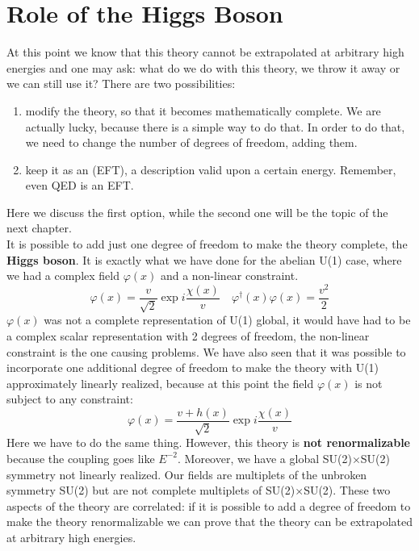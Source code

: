 \documentclass[../main.tex]{subfiles}
\begin{document}
\section{Role of the Higgs Boson}
At this point we know that this theory cannot be extrapolated at arbitrary high energies and one may ask: what do we do with this theory, we throw it away or we can still use it? There are two possibilities:
\begin{enumerate}
    \item modify the theory, so that it becomes mathematically complete. We are actually lucky, because there is a simple way to do that. In order to do that, we need to change the number of degrees of freedom, adding them.
    \item keep it as an  (EFT), a description valid upon a certain energy. Remember, even QED is an EFT.
\end{enumerate}
Here we discuss the first option, while the second one will be the topic of the next chapter.\\
It is possible to add just one degree of freedom to make the theory complete, the \textbf{Higgs boson}. It is exactly what we have done for the abelian U(1) case, where we had a complex field $\varphi(x)$ and a non-linear constraint.
\[
\varphi(x)=\frac{v}{\sqrt{2}}\exp{i\frac{\chi(x)}{v}} \quad \varphi^\dagger(x)\varphi(x)=\frac{v^2}{2}
\]
$\varphi(x)$ was not a complete representation of U(1) global, it would have had to be a complex scalar representation with 2 degrees of freedom, the non-linear constraint is the one causing problems. We have also seen that it was possible to incorporate one additional degree of freedom to make the theory with U(1) approximately linearly realized, because at this point the field $\varphi(x)$ is not subject to any constraint:
\[
\varphi(x)=\frac{v+h(x)}{\sqrt{2}}\exp{i\frac{\chi(x)}{v}}
\]
Here we have to do the same thing. However, this theory is \textbf{not renormalizable} because the coupling goes like $E^{-2}$. Moreover, we have a global SU(2)$\times$SU(2) symmetry not linearly realized. Our fields are multiplets of the unbroken symmetry SU(2) but are not complete multiplets of SU(2)$\times$SU(2). These two aspects of the theory are correlated: if it is possible to add a degree of freedom to make the theory renormalizable we can prove that the theory can be extrapolated at arbitrary high energies.\\
\end{document}
